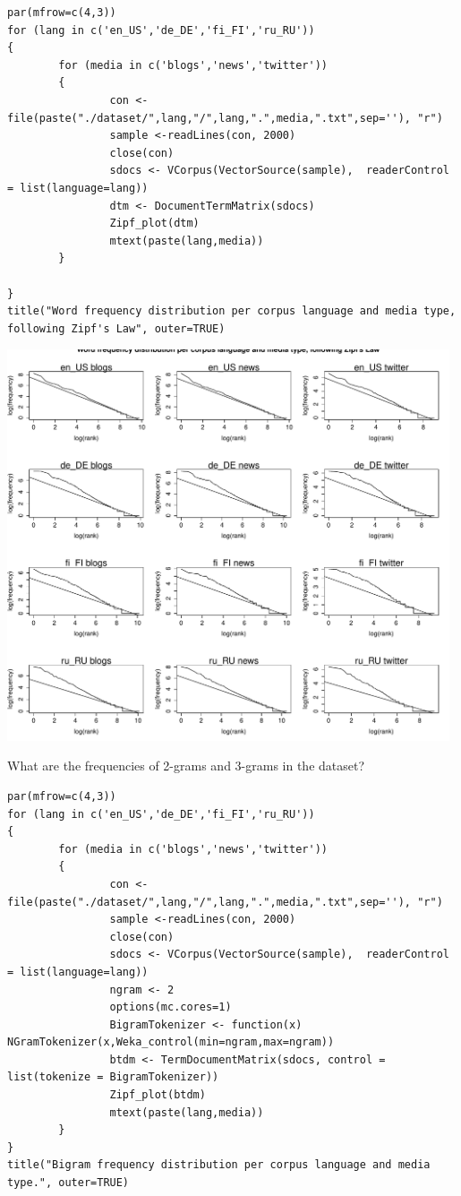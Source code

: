 \documentclass{article}
\begin{document}
\begin{lstlisting}
par(mfrow=c(4,3))
for (lang in c('en_US','de_DE','fi_FI','ru_RU'))
{
        for (media in c('blogs','news','twitter'))
        {
                con <- file(paste("./dataset/",lang,"/",lang,".",media,".txt",sep=''), "r")
                sample <-readLines(con, 2000)
                close(con)
                sdocs <- VCorpus(VectorSource(sample),  readerControl = list(language=lang))
                dtm <- DocumentTermMatrix(sdocs)
                Zipf_plot(dtm)
                mtext(paste(lang,media))
        }
        
}
title("Word frequency distribution per corpus language and media type, following Zipf's Law", outer=TRUE)
\end{lstlisting}

\includegraphics[width=0.98\textwidth]{graphics/zipf.pdf}

What are the frequencies of 2-grams and 3-grams in the dataset? 


\begin{lstlisting}
par(mfrow=c(4,3))
for (lang in c('en_US','de_DE','fi_FI','ru_RU'))
{
        for (media in c('blogs','news','twitter'))
        {
                con <- file(paste("./dataset/",lang,"/",lang,".",media,".txt",sep=''), "r")
                sample <-readLines(con, 2000)
                close(con)
                sdocs <- VCorpus(VectorSource(sample),  readerControl = list(language=lang))
                ngram <- 2
                options(mc.cores=1)
                BigramTokenizer <- function(x) NGramTokenizer(x,Weka_control(min=ngram,max=ngram))
                btdm <- TermDocumentMatrix(sdocs, control = list(tokenize = BigramTokenizer))
                Zipf_plot(btdm)
                mtext(paste(lang,media))
        }
}
title("Bigram frequency distribution per corpus language and media type.", outer=TRUE)
\end{lstlisting}
\end{document}
